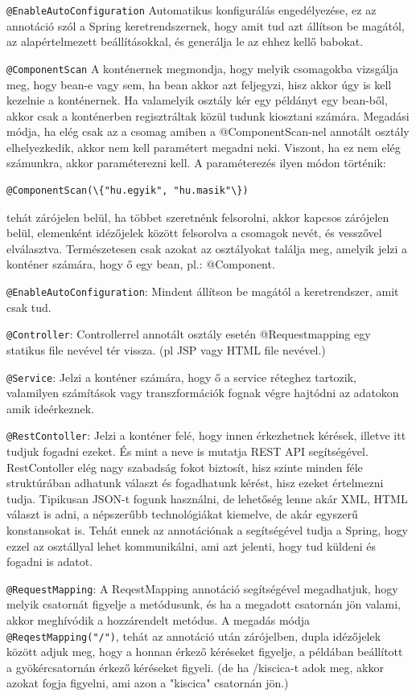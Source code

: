 \texttt{@EnableAutoConfiguration} Automatikus konfigurálás engedélyezése, ez az annotáció szól a Spring keretrendszernek, hogy amit tud azt állítson be magától, az alapértelmezett beállításokkal, és generálja le az ehhez kellő babokat.

\texttt{@ComponentScan} A konténernek megmondja, hogy melyik csomagokba vizsgálja meg, hogy bean-e vagy sem, ha bean akkor azt feljegyzi, hisz akkor úgy is kell kezelnie  a konténernek. Ha valamelyik osztály kér egy példányt egy bean-ből, akkor csak a konténerben regisztráltak közül tudunk kiosztani számára. Megadási módja, ha elég csak az a csomag amiben a @ComponentScan-nel annotált osztály elhelyezkedik, akkor nem kell paramétert megadni neki. Viszont, ha ez nem elég számunkra, akkor paraméterezni kell. A paraméterezés ilyen módon történik:
\begin{verbatim}
@ComponentScan(\{"hu.egyik", "hu.masik"\})
\end{verbatim}
tehát zárójelen belül, ha többet szeretnénk felsorolni, akkor kapcsos zárójelen belül, elemenként idézőjelek között felsorolva a csomagok nevét, és vesszővel elválasztva. Természetesen csak azokat az osztályokat találja meg, amelyik jelzi a konténer számára, hogy ő egy bean, pl.: @Component.

\texttt{@EnableAutoConfiguration}: Mindent állítson be magától a keretrendszer, amit csak tud.

\texttt{@Controller}: Controllerrel annotált osztály esetén @Requestmapping egy statikus file nevével tér vissza. (pl JSP vagy HTML file nevével.)

\texttt{@Service}: Jelzi a konténer számára, hogy ő a service réteghez tartozik, valamilyen számítások vagy transzformációk fognak végre hajtódni az adatokon amik ideérkeznek.

\texttt{@RestContoller}:
Jelzi a konténer felé, hogy innen érkezhetnek kérések, illetve itt tudjuk fogadni ezeket. És mint a neve is mutatja REST API segítségével. RestContoller elég nagy szabadság fokot biztosít, hisz szinte minden féle struktúrában adhatunk választ és fogadhatunk kérést, hisz ezeket értelmezni tudja. Tipikusan JSON-t fogunk használni, de lehetőség lenne akár XML, HTML választ is adni, a népszerűbb technológiákat kiemelve, de akár egyszerű konstansokat is. Tehát ennek az annotációnak a segítségével tudja a Spring, hogy ezzel az osztállyal lehet kommunikálni, ami azt jelenti, hogy tud küldeni és fogadni is adatot.

\texttt{@RequestMapping}:
A ReqestMapping annotáció segítségével megadhatjuk, hogy melyik csatornát figyelje a metódusunk, és ha a megadott csatornán jön valami, akkor meghívódik a hozzárendelt metódus.  A megadás módja \texttt{@ReqestMapping("/")}, tehát az annotáció után zárójelben, dupla idézőjelek között adjuk meg, hogy a honnan érkező kéréseket figyelje, a példában beállított a gyökércsatornán érkező kéréseket figyeli. (de ha /kiscica-t adok meg, akkor azokat fogja figyelni, ami azon a "kiscica" csatornán jön.)

